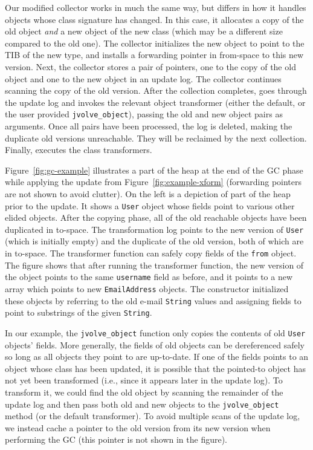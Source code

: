 Our modified collector works in much the same way, but differs in how
it handles objects whose class signature has changed.  In this case,
it allocates a copy of the old object \emph{and} a new object of the new
class (which may be a different size compared to the old one). The collector
initializes the new object to point to the TIB of the new type, and
installs a forwarding pointer in from-space to this new version. Next,
the collector stores a pair of pointers, one to the copy of the old object and one to the
new object in an update log.  The collector continues scanning the
copy of the old version.  After the collection completes, \DSU{} goes
through the update log and invokes the relevant object transformer
(either the default, or the user provided \texttt{jvolve\_object}), passing
the old and new object pairs as arguments.  Once all
pairs have been processed, the log is deleted, making the  duplicate
old versions unreachable. They will be reclaimed by the next collection.
Finally, \DSU{} executes the class transformers.

Figure~\ref{fig:gc-example} illustrates a part of the heap at the end
of the GC phase while applying the update from
Figure~\ref{fig:example-xform} (forwarding pointers are not shown to
avoid clutter).  On the left is a depiction of part of the heap prior
to the update.  It shows a \texttt{User} object whose fields point to
various other elided objects.  After the copying phase, all of the old
reachable objects have been duplicated in to-space.  The
transformation log points to the new version of \texttt{User} (which
is initially empty) and the duplicate of the old version, both of
which are in to-space.  The transformer function can safely copy
fields of the \texttt{from} object. The figure shows that after
running the transformer function, the new version of the object points
to the same \texttt{username} field as before, and it points to a new
array which points to new \texttt{EmailAddress} objects. The
constructor initialized these objects by referring to the old e-mail
\texttt{String} values and assigning fields to point to substrings of
the given \texttt{String}.

In our example, the \texttt{jvolve\_object} function only copies the
contents of old \texttt{User} objects' fields.  More generally,
the fields of old objects can
be dereferenced safely so long as all objects they point to are
up-to-date.  If one of the fields points to an object whose class has
been updated, it is possible that the pointed-to object has not yet
been transformed (i.e., since it appears later in the update log).  To
transform it, we could find the old object by scanning the remainder
of the update log and then pass both old and new objects to the
\texttt{jvolve\_object} method (or the default transformer).
To avoid multiple scans of the update log, we instead cache a pointer to
the old version from 
its new version when performing the GC (this pointer is not shown in
the figure).

